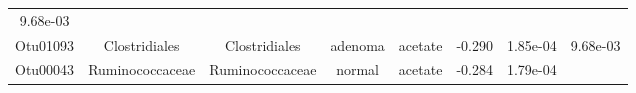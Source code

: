 \documentclass[11pt,]{article}
\begin{document}
\begin{longtable}[]{@{}cccccccc@{}}
\begin{minipage}[t]{0.08\columnwidth}
9.68e-03\strut
\end{minipage}\tabularnewline
\begin{minipage}[t]{0.08\columnwidth}\centering\strut
Otu01093\strut
\end{minipage} & \begin{minipage}[t]{0.15\columnwidth}\centering\strut
Clostridiales\strut
\end{minipage} & \begin{minipage}[t]{0.15\columnwidth}\centering\strut
Clostridiales\strut
\end{minipage} & \begin{minipage}[t]{0.08\columnwidth}\centering\strut
adenoma\strut
\end{minipage} & \begin{minipage}[t]{0.09\columnwidth}\centering\strut
acetate\strut
\end{minipage} & \begin{minipage}[t]{0.07\columnwidth}\centering\strut
-0.290\strut
\end{minipage} & \begin{minipage}[t]{0.08\columnwidth}\centering\strut
1.85e-04\strut
\end{minipage} & \begin{minipage}[t]{0.08\columnwidth}\centering\strut
9.68e-03\strut
\end{minipage}\tabularnewline
\begin{minipage}[t]{0.08\columnwidth}\centering\strut
Otu00043\strut
\end{minipage} & \begin{minipage}[t]{0.15\columnwidth}\centering\strut
Ruminococcaceae\strut
\end{minipage} & \begin{minipage}[t]{0.15\columnwidth}\centering\strut
Ruminococcaceae\strut
\end{minipage} & \begin{minipage}[t]{0.08\columnwidth}\centering\strut
normal\strut
\end{minipage} & \begin{minipage}[t]{0.09\columnwidth}\centering\strut
acetate\strut
\end{minipage} & \begin{minipage}[t]{0.07\columnwidth}\centering\strut
-0.284\strut
\end{minipage} & \begin{minipage}[t]{0.08\columnwidth}\centering\strut
1.79e-04\strut
\end{minipage} & \begin{minipage}[t]{0.08\columnwidth}\centering\strut

\end{minipage}
\end{longtable}
\end{document}
